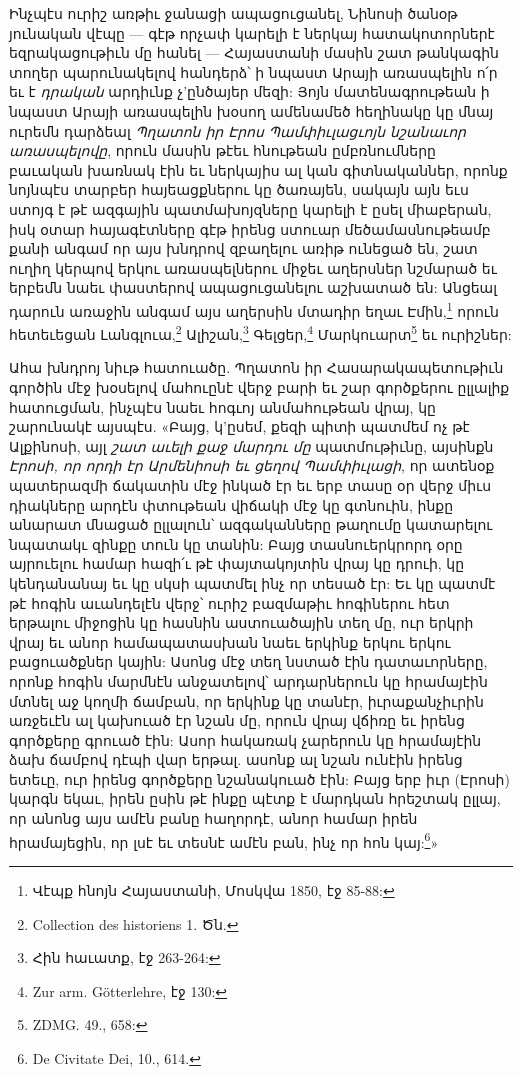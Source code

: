 \documentclass{article}
\begin{document}
{Ինչպէս ուրիշ առթիւ ջանացի ապացուցանել, Նինոսի ծանօթ յունական վէպը — գէթ որչափ կարելի է ներկայ հատակոտորներէ եզրակացութիւն մը հանել — Հայաստանի մասին շատ թանկագին տողեր պարունակելով հանդերձ՝ ի նպաստ Արայի առասպելին ո՛ր եւ է \emph{դրական} արդիւնք չ'ընծայեր մեզի: Յոյն մատենագրութեան ի նպաստ Արայի առասպելին խօսող ամենամեծ հեղինակը կը մնայ ուրեմն դարձեալ \emph{Պղատոն իր Էրոս Պամփիւլացւոյն նշանաւոր առասպելովը}, որուն մասին թէեւ հնութեան ըմբռնումները բաւական խառնակ էին եւ ներկայիս ալ կան գիտնականներ, որոնք նոյնպէս տարբեր հայեացքներու կը ծառայեն, սակայն այն եւս ստոյգ է թէ ազգային պատմախոյզները կարելի է ըսել միաբերան, իսկ օտար հայագէտները գէթ իրենց ստուար մեծամասնութեամբ քանի անգամ որ այս խնդրով զբաղելու առիթ ունեցած են, շատ ուղիղ կերպով երկու առասպելներու միջեւ աղերսներ նշմարած եւ երբեմն նաեւ փաստերով ապացուցանելու աշխատած են: Անցեալ դարուն առաջին անգամ այս աղերսին մտադիր եղաւ Էմին,\footnote{Վէպք հնոյն Հայաստանի, Մոսկվա 1850, էջ 85-88:} որուն հետեւեցան Լանգլուա,\footnote{Collection des historiens 1. Ծն.} Ալիշան,\footnote{Հին հաւատք, էջ 263-264:} Գելցեր,\footnote{Zur arm. Götterlehre, էջ 130:} Մարկուարտ\footnote{ZDMG. 49., 658:} եւ ուրիշներ:

Ահա խնդրոյ նիւթ հատուածը. Պղատոն իր Հասարակապետութիւն գործին մէջ խօսելով մահուընէ վերջ բարի եւ շար գործքերու ըլլալիք հատուցման, ինչպէս նաեւ հոգւոյ անմահութեան վրայ, կը շարունակէ այսպէս. «Բայց, կ'ըսեմ, քեզի պիտի պատմեմ ոչ թէ Ալքինոսի, այլ \emph{շատ աւելի քաջ մարդու մը} պատմութիւնը, այսինքն \emph{Էրոսի, որ որդի էր Արմենիոսի եւ ցեղով Պամփիւլացի}, որ ատենօք պատերազմի ճակատին մէջ ինկած էր եւ երբ տասը օր վերջ միւս դիակները արդէն փտութեան վիճակի մէջ կը գտնուին, ինքը անարատ մնացած ըլլալուն՝ ազգականները թաղումը կատարելու նպատակւ զինքը տուն կը տանին: Բայց տասնուերկրորդ օրը այրուելու համար հազի՛ւ թէ փայտակոյտին վրայ կը դրուի, կը կենդանանայ եւ կը սկսի պատմել ինչ որ տեսած էր: Եւ կը պատմէ թէ հոգին աւանդելէն վերջ՝ ուրիշ բազմաթիւ հոգիներու հետ երթալու միջոցին կը հասնին աստուածային տեղ մը, ուր երկրի վրայ եւ անոր համապատասխան նաեւ երկինք երկու երկու բացուածքներ կային: Ասոնց մէջ տեղ նստած էին դատաւորները, որոնք հոգին մարմնէն անջատելով՝ արդարներուն կը հրամայէին մտնել աջ կողմի ճամբան, որ երկինք կը տանէր, իւրաքանչիւրին առջեւէն ալ կախուած էր նշան մը, որուն վրայ վճիռը եւ իրենց գործքերը գրուած էին: Ասոր հակառակ չարերուն կը հրամայէին ձախ ճամբով դէպի վար երթալ. ասոնք ալ նշան ունէին իրենց ետեւը, ուր իրենց գործքերը նշանակուած էին: Բայց երբ իւր (Էրոսի) կարգն եկաւ, իրեն ըսին թէ ինքը պէտք է մարդկան հրեշտակ ըլլայ, որ անոնց այս ամէն բանը հաղորդէ, անոր համար իրեն հրամայեցին, որ լսէ եւ տեսնէ ամէն բան, ինչ որ հոն կայ:\footnote{De Civitate Dei, 10., 614.}»

}
\end{document}
